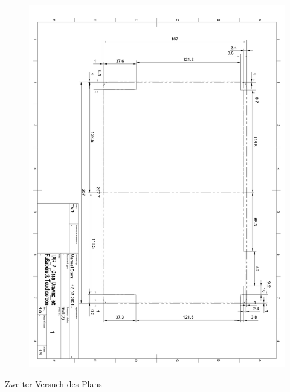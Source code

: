 \begin{figure}[ht!]
	\includegraphics*[width=1\textwidth, page=1]{pdf/gehäuse_zeichnung_fußabdruck_final.pdf}
 	\label{case_footprint_final}
\end{figure}
\begin{center}
Zweiter Versuch des Plans
\end{center}
\newpage